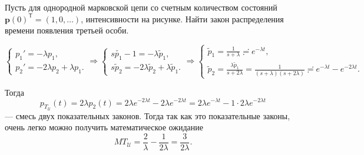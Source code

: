 \begin{ex}
  Пусть для однородной марковской цепи со счетным количеством состояний 
  $\mathbf p(0)^{\mathsf T} = (1, 0, \dots)$, интенсивности на рисунке.
  Найти закон распределения времени появления третьей особи.
  \begin{figure}[h!]
    \centering
  \end{figure}

  \[
    \begin{cases}
      p_1' = - \lambda p_1, \\
      p_2' = -2 \lambda p_2 + \lambda p_1.
    \end{cases}
    \Rightarrow
    \begin{cases}
      s \tilde{p_1} - 1 = - \lambda \tilde p_1, \\
      s \tilde p_2 = - 2 \lambda \tilde p_2 + \lambda \tilde p_1.
    \end{cases}
    \Rightarrow
    \begin{cases}
      \tilde p_1 = \frac{1}{s+\lambda} \risingdotseq e^{-\lambda t}, \\
      \tilde p_2 = \frac{\lambda \tilde p_1}{s+2\lambda} 
      = \frac{1}{(s+\lambda)(s+2\lambda)} \risingdotseq e^{-\lambda t} - e^{-2\lambda t}.
    \end{cases}
  \]

  Тогда
  \[
  p_{T_{\mathscr U}} (t) = 2\lambda p_2(t) = 2\lambda e^{-2\lambda t} - 2\lambda e^{-2\lambda t}
    = 2 \lambda e^{-\lambda t} - 1 \cdot 2\lambda e^{-2\lambda t}
  \]
  --- смесь двух показательных законов.
  Тогда так как это показательные законы, очень легко можно получить
  математическое ожидание
  \[
    MT_{\mathscr U} = \dfrac{2}{\lambda} - \dfrac{1}{2\lambda} = \dfrac{3}{2\lambda}.
  \]
\end{ex}



